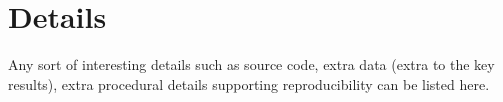 \section{Details}
\label{S:details}

Any sort of interesting details such as source code, extra data (extra
to the key results), extra procedural details supporting
reproducibility can be listed here.
